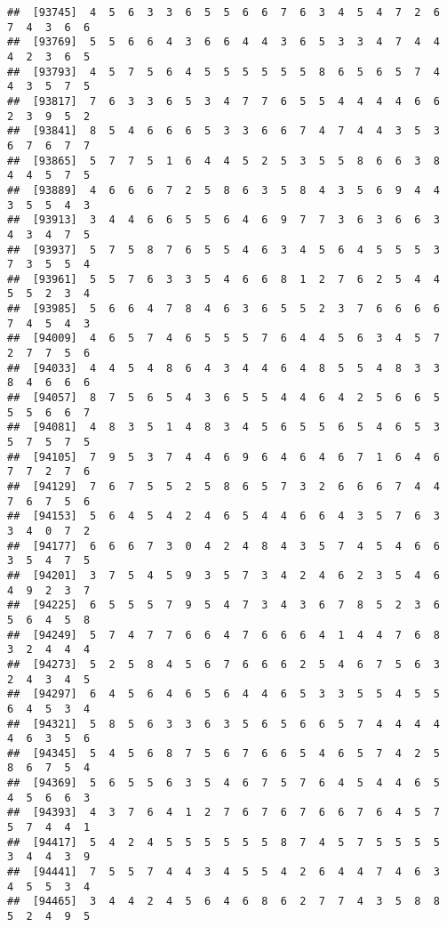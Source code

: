 \documentclass[
]{book}
\begin{document}
\begin{verbatim}
##  [93745]  4  5  6  3  3  6  5  5  6  6  7  6  3  4  5  4  7  2  6  7  4  3  6  6
##  [93769]  5  5  6  6  4  3  6  6  4  4  3  6  5  3  3  4  7  4  4  4  2  3  6  5
##  [93793]  4  5  7  5  6  4  5  5  5  5  5  5  8  6  5  6  5  7  4  4  3  5  7  5
##  [93817]  7  6  3  3  6  5  3  4  7  7  6  5  5  4  4  4  4  6  6  2  3  9  5  2
##  [93841]  8  5  4  6  6  6  5  3  3  6  6  7  4  7  4  4  3  5  3  6  7  6  7  7
##  [93865]  5  7  7  5  1  6  4  4  5  2  5  3  5  5  8  6  6  3  8  4  4  5  7  5
##  [93889]  4  6  6  6  7  2  5  8  6  3  5  8  4  3  5  6  9  4  4  3  5  5  4  3
##  [93913]  3  4  4  6  6  5  5  6  4  6  9  7  7  3  6  3  6  6  3  4  3  4  7  5
##  [93937]  5  7  5  8  7  6  5  5  4  6  3  4  5  6  4  5  5  5  3  7  3  5  5  4
##  [93961]  5  5  7  6  3  3  5  4  6  6  8  1  2  7  6  2  5  4  4  5  5  2  3  4
##  [93985]  5  6  6  4  7  8  4  6  3  6  5  5  2  3  7  6  6  6  6  7  4  5  4  3
##  [94009]  4  6  5  7  4  6  5  5  5  7  6  4  4  5  6  3  4  5  7  2  7  7  5  6
##  [94033]  4  4  5  4  8  6  4  3  4  4  6  4  8  5  5  4  8  3  3  8  4  6  6  6
##  [94057]  8  7  5  6  5  4  3  6  5  5  4  4  6  4  2  5  6  6  5  5  5  6  6  7
##  [94081]  4  8  3  5  1  4  8  3  4  5  6  5  5  6  5  4  6  5  3  5  7  5  7  5
##  [94105]  7  9  5  3  7  4  4  6  9  6  4  6  4  6  7  1  6  4  6  7  7  2  7  6
##  [94129]  7  6  7  5  5  2  5  8  6  5  7  3  2  6  6  6  7  4  4  7  6  7  5  6
##  [94153]  5  6  4  5  4  2  4  6  5  4  4  6  6  4  3  5  7  6  3  3  4  0  7  2
##  [94177]  6  6  6  7  3  0  4  2  4  8  4  3  5  7  4  5  4  6  6  3  5  4  7  5
##  [94201]  3  7  5  4  5  9  3  5  7  3  4  2  4  6  2  3  5  4  6  4  9  2  3  7
##  [94225]  6  5  5  5  7  9  5  4  7  3  4  3  6  7  8  5  2  3  6  5  6  4  5  8
##  [94249]  5  7  4  7  7  6  6  4  7  6  6  6  4  1  4  4  7  6  8  3  2  4  4  4
##  [94273]  5  2  5  8  4  5  6  7  6  6  6  2  5  4  6  7  5  6  3  2  4  3  4  5
##  [94297]  6  4  5  6  4  6  5  6  4  4  6  5  3  3  5  5  4  5  5  6  4  5  3  4
##  [94321]  5  8  5  6  3  3  6  3  5  6  5  6  6  5  7  4  4  4  4  4  6  3  5  6
##  [94345]  5  4  5  6  8  7  5  6  7  6  6  5  4  6  5  7  4  2  5  8  6  7  5  4
##  [94369]  5  6  5  5  6  3  5  4  6  7  5  7  6  4  5  4  4  6  5  4  5  6  6  3
##  [94393]  4  3  7  6  4  1  2  7  6  7  6  7  6  6  7  6  4  5  7  5  7  4  4  1
##  [94417]  5  4  2  4  5  5  5  5  5  5  8  7  4  5  7  5  5  5  5  3  4  4  3  9
##  [94441]  7  5  5  7  4  4  3  4  5  5  4  2  6  4  4  7  4  6  3  4  5  5  3  4
##  [94465]  3  4  4  2  4  5  6  4  6  8  6  2  7  7  4  3  5  8  8  5  2  4  9  5

\end{verbatim}
\end{document}

